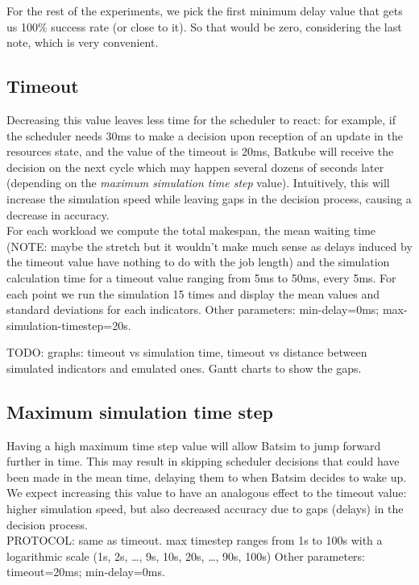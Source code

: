 \documentclass[12pt, a4paper]{memoir}
\begin{document}
For the rest of the experiments, we pick the first minimum delay value that
gets us 100\% success rate (or close to it). So that would be zero, considering
the last note, which is very convenient.

\subsection{Timeout}

Decreasing this value leaves less time for the scheduler to react: for example,
if the scheduler needs 30ms to make a decision upon reception of an update in
the resources state, and the value of the timeout is 20ms, Batkube will receive
the decision on the next cycle which may happen several dozens of seconds later
(depending on the \textit{maximum simulation time step} value). Intuitively,
this will increase the simulation speed while leaving gaps in the decision
process, causing a decrease in accuracy.\\

For each workload we compute the total makespan, the mean waiting time (NOTE:
maybe the stretch but it wouldn't make much sense as delays induced by the
timeout value have nothing to do with the job length) and the simulation
calculation time for a timeout value ranging from 5ms to 50ms, every 5ms. For
each point we run the simulation 15 times and display the mean values and
standard deviations for each indicators. Other parameters: min-delay=0ms; max-simulation-timestep=20s.

TODO: graphs: timeout vs simulation time, timeout vs distance between simulated
indicators and emulated ones.
Gantt charts to show the gaps.

\subsection{Maximum simulation time step}

Having a high maximum time step value will allow Batsim to jump forward further
in time. This may result in skipping scheduler decisions that could have been
made in the mean time, delaying them to when Batsim decides to wake up. We
expect increasing this value to have an analogous effect to the timeout value:
higher simulation speed, but also decreased accuracy due to gaps (delays) in
the decision process.\\

PROTOCOL: same as timeout. max timestep ranges from 1s to 100s with a
logarithmic scale (1s, 2s, \ldots, 9s, 10s, 20s, \ldots, 90s, 100s) Other
parameters: timeout=20ms; min-delay=0ms.
\end{document}

